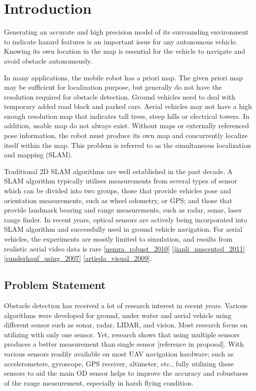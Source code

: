 \chapter{Introduction} \label{ch:intro}

Generating an accurate and high precision model of its surrounding 
environment to indicate hazard features is an important issue for any 
autonomous vehicle. Knowing its own location in the map is essential for 
the vehicle to navigate and avoid obstacle autonomously. 

In many applications, the mobile robot has a priori map. The given 
priori map may be sufficient for localization purpose, but generally do 
not have the resolution required for obstacle detection. Ground vehicles 
need to deal with temporary added road block and parked cars. Aerial 
vehicles may not have a high enough resolution map that indicates tall 
trees, steep hills or electrical towers. In addition, usable map do not 
always exist. Without maps or externally referenced pose information, 
the robot must produce its own map and concurrently localize itself 
within the map. This problem is referred to as the simultaneous 
localization and mapping (SLAM). 

Traditional 2D SLAM algorithms are well established in the past
decade. A SLAM algorithm typically utilises measurements from several
types of sensor which can be divided into two groups, those that
provide vehicles pose and orientation measurements, such as wheel
odometry, or GPS; and those that provide landmark bearing and range
measurements, such as radar, sonar, laser range finder. In recent
years, optical sensors are actively being incorporated into SLAM
algorithm and successfully used in ground vehicle navigation. For
aerial vehicles, the experiments are mostly limited to simulation, and
results from realistic aerial video data is rare \ref{nemra_robust_2010}
\ref{jianli_unscented_2011} \ref{sunderhauf_using_2007} \ref{artieda_visual_2009}.

\section{Problem Statement}\label{section:ProblemStatement}
Obstacle detection has received a lot of research interest in recent 
years. Various algorithms were developed for ground, under water and 
aerial vehicle using different sensor such as sonar, radar, LIDAR, and 
vision. Most research focus on utilizing with only one sensor. Yet, 
research shows that using multiple sensors produces a better measurement 
than single sensor [reference in proposal]. With various sensors 
readily available on most UAV navigation hardware; such as 
accelerometers, gyroscope, GPS receiver, altimeter, etc., fully 
utilizing these sensors to aid the main OD sensor helps to improve the 
accuracy and robustness of the range measurement, especially in harsh 
flying condition. 

